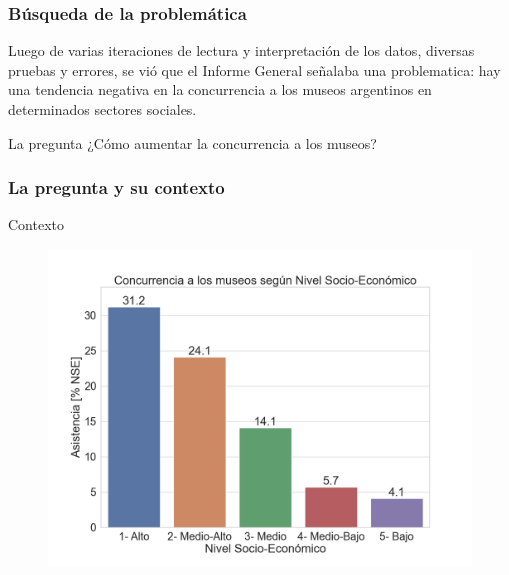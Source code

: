 \documentclass{beamer}
\begin{document}
\begin{frame}
\frametitle{Búsqueda de la problemática}

Luego de varias iteraciones de lectura y interpretación de los datos, diversas pruebas y errores, se vió que el Informe General señalaba una problematica: hay una tendencia negativa en la concurrencia a los museos argentinos en determinados sectores sociales.

\begin{block}{La pregunta}
¿Cómo aumentar la concurrencia a los museos?
\end{block}

\end{frame}

\begin{frame}
\frametitle{La pregunta y su contexto}

\begin{block}{Contexto}
\begin{figure}
\centering
\includegraphics[height=0.6\textheight]{asist_museo_nse_x100}
\label{fig:asist_museo_nse}
\end{figure}



\end{block}

\end{frame}
\end{document}
